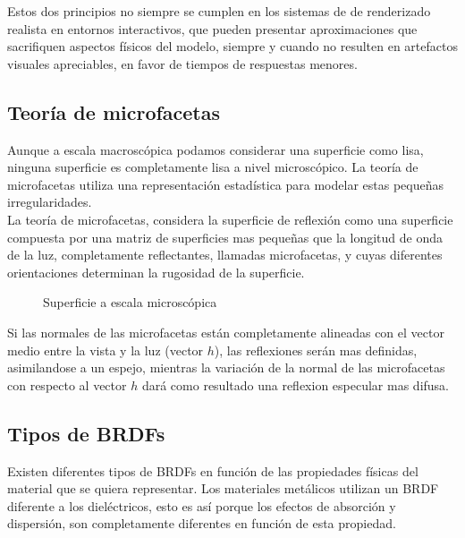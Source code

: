 Estos dos principios no siempre se cumplen en los sistemas de de renderizado realista en entornos interactivos, que pueden presentar
aproximaciones que sacrifiquen aspectos f\'isicos del modelo, siempre y cuando no resulten en artefactos visuales apreciables, en
favor de tiempos de respuestas menores.

    \subsection{Teor\'ia de microfacetas}

    \bgroup

        Aunque a escala macrosc\'opica podamos considerar una superficie como lisa, ninguna superficie es completamente lisa a nivel
        microsc\'opico. La teor\'ia de microfacetas utiliza una representaci\'on estad\'istica para modelar estas peque\~nas irregularidades.\\

        La teor\'ia de microfacetas, considera la superficie de reflexi\'on como una superficie compuesta por una matriz de
        superficies mas peque\~nas que la longitud de onda de la luz, completamente reflectantes, llamadas microfacetas, y cuyas
        diferentes orientaciones determinan la rugosidad de la superficie.\\

        \begin{figure}[H]
            \centering
            \caption{Superficie a escala microsc\'opica}
            \vspace{0.5cm}
        \end{figure}

        Si las normales de las microfacetas est\'an completamente alineadas con el vector medio entre la vista y la luz (vector $h$),
        las reflexiones ser\'an mas definidas, asimilandose a un espejo, mientras la variaci\'on de la normal de las microfacetas con
        respecto al vector $h$ dar\'a como resultado una reflexion especular mas difusa.

    \egroup


    \subsection{Tipos de BRDFs}
    Existen diferentes tipos de BRDFs en funci\'on de las propiedades f\'isicas del material que se quiera representar. Los
    materiales met\'alicos utilizan un BRDF diferente a los diel\'ectricos, esto es as\'i porque los efectos de absorci\'on y
    dispersi\'on, son completamente diferentes en funci\'on de esta propiedad.\\

